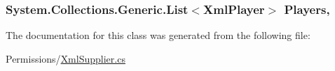 \subsubsection[{Players}]{\setlength{\rightskip}{0pt plus 5cm}System.\+Collections.\+Generic.\+List$<${\bf Xml\+Player}$>$ Players\hspace{0.3cm}{\ttfamily [get]}, {\ttfamily [set]}}\label{classOTA_1_1Permissions_1_1XmlReflect_abd51d2a63e265b90600180820cd80bda}


The documentation for this class was generated from the following file\+:\begin{DoxyCompactItemize}
\item 
Permissions/\hyperlink{XmlSupplier_8cs}{Xml\+Supplier.\+cs}\end{DoxyCompactItemize}
